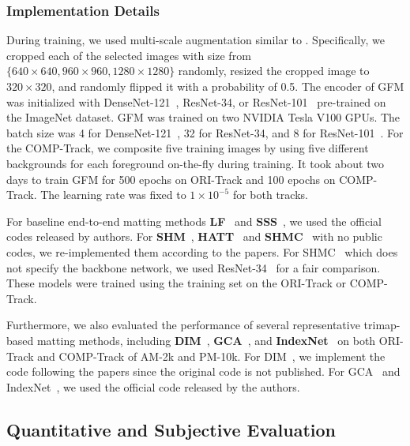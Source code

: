 \documentclass[twocolumn]{svjour3}
\begin{document}
\subsubsection{Implementation Details} During training, we used multi-scale augmentation similar to \citep{xu2017deep}. Specifically, we cropped each of the selected images with size from $\{640\times640, 960\times960, 1280\times1280\}$ randomly, resized the cropped image to $320\times320$, and randomly flipped it with a probability of 0.5. The encoder of GFM was initialized with DenseNet-121~\citep{huang2017densely}, ResNet-34, or ResNet-101~\citep{he2016deep} pre-trained on the ImageNet dataset. GFM was trained on two NVIDIA Tesla V100 GPUs. The batch size was 4 for DenseNet-121~\citep{huang2017densely}, 32 for ResNet-34, and 8 for ResNet-101~\citep{he2016deep}. For the COMP-Track, we composite five training images by using five different backgrounds for each foreground on-the-fly during training. It took about two days to train GFM for 500 epochs on ORI-Track and 100 epochs on COMP-Track. The learning rate was fixed to $1\times10^{-5}$ for both tracks.

For baseline end-to-end matting methods \textbf{LF}~\citep{zhang2019late} and \textbf{SSS}~\citep{aksoy2018semantic}, we used the official codes released by authors. For \textbf{SHM}~\citep{chen2018semantic}, \textbf{HATT}~\citep{Qiao_2020_CVPR} and \textbf{SHMC}~\citep{liu2020boosting} with no public codes, we re-implemented them according to the papers. For SHMC~\citep{liu2020boosting} which does not specify the backbone network, we used ResNet-34~\citep{he2016deep} for a fair comparison. These models were trained using the training set on the ORI-Track or COMP-Track.

Furthermore, we also evaluated the performance of several representative trimap-based matting methods, including \textbf{DIM}~\citep{xu2017deep}, \textbf{GCA}~\citep{li2020natural}, and \textbf{IndexNet}~\citep{hao2019indexnet} on both ORI-Track and COMP-Track of AM-2k and PM-10k. For DIM~\citep{xu2017deep}, we implement the code following the papers since the original code is not published. For GCA~\citep{li2020natural} and IndexNet~\citep{hao2019indexnet}, we used the official code released by the authors.



\subsection{Quantitative and Subjective Evaluation}
\end{document}
